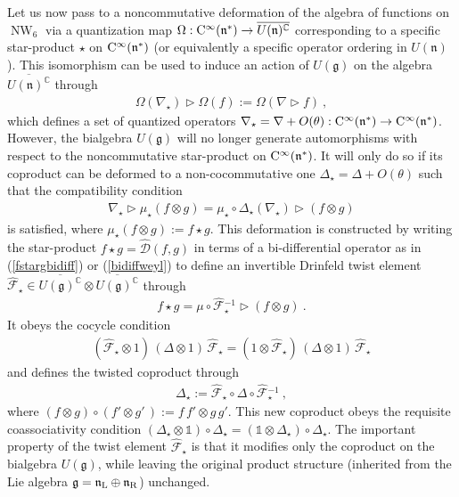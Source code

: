 \documentclass[11pt,a4paper]{article}
\DeclareMathOperator{\NW}{NW}
\def\one{\mathbb{1}}
\def\CC{{\rm C}}
\def\mfn{{\mathfrak n}}
\def\mfg{{\mathfrak g}}
\newcommand{\complex}{{\mathbb C}} %
\newcommand{\beq}{\begin{eqnarray}}
\newcommand{\eeq}{\end{eqnarray}}
\begin{document}
Let us now pass to a noncommutative deformation of the algebra of
functions on $\NW_6$ via a quantization map
$\Omega:\CC^\infty(\mfn^*)\to\overline{U(\mfn)^\complex}$
corresponding to a specific star-product $\star$ on
$\CC^\infty(\mfn^*)$ (or equivalently a specific operator ordering in
$U(\mfn)$). This isomorphism can be used to induce an action of
$U(\mfg)$ on the algebra $\overline{U(\mfn)^\complex}$ through
\beq
\Omega(\nabla_\star)\triangleright\Omega(f):=
\Omega(\nabla\triangleright f) \ ,
\label{nablastar}\eeq
which defines a set of quantized operators
$\nabla_\star=\nabla+O(\theta):\CC^\infty(\mfn^*)\to\CC^\infty(\mfn^*)$.
However, the bialgebra $U(\mfg)$ will no longer generate automorphisms
with respect to the noncommutative star-product on
$\CC^\infty(\mfn^*)$. It will only do so if its coproduct can be
deformed to a non-cocommutative one $\Delta_\star=\Delta+O(\theta)$
such that the compatibility condition
\beq
\nabla_\star\triangleright\mu_\star(f\otimes g)=\mu_\star\circ
\Delta_\star(\nabla_\star)\triangleright(f\otimes g)
\label{NCcoprodcomp}\eeq
is satisfied, where $\mu_\star(f\otimes g):=f\star g$. This deformation is
constructed by writing the star-product $f\star
g=\hat{\mathcal D}(f,g)$ in terms of a bi-differential operator as in
(\ref{fstargbidiff}) or (\ref{bidiffweyl}) to define an invertible
Drinfeld twist element $\hat{\mathcal F}_\star\in
\overline{U(\mfg)^\complex}\otimes\overline{U(\mfg)^\complex}$ through
\beq
f\star g=\mu\circ\hat{\mathcal F}{}_\star^{-1}\triangleright(f\otimes
g) \ .
\label{Dtwistdef}\eeq
It obeys the cocycle condition
\beq
(\hat{\mathcal F}_\star\otimes1)\,(\Delta\otimes1)\,\hat
{\mathcal F}_\star=(1\otimes\hat{\mathcal F}_\star)\,
(\Delta\otimes1)\,\hat{\mathcal F}_\star
\label{twistcocycle}\eeq
and defines the twisted coproduct through
\beq
\Delta_\star:=\hat{\mathcal F}_\star^{~}\circ\Delta\circ
\hat{\mathcal F}{}_\star^{-1} \ ,
\label{Deltastardef}\eeq
where $(f\otimes g)\circ(f'\otimes g'\,):=f\,f'\otimes g\,g'$. This new
coproduct obeys the requisite coassociativity condition
$(\Delta_\star\otimes\one)\circ\Delta_\star=(\one\otimes\Delta_\star)
\circ\Delta_\star$. The important property of the twist element
$\hat{\mathcal F}_\star$ is that it modifies only the coproduct on the
bialgebra $U(\mfg)$, while leaving the original product structure
(inherited from the Lie algebra $\mfg=\mfn_{\rm L}\oplus\mfn_{\rm
  R}$) unchanged.
\end{document}

